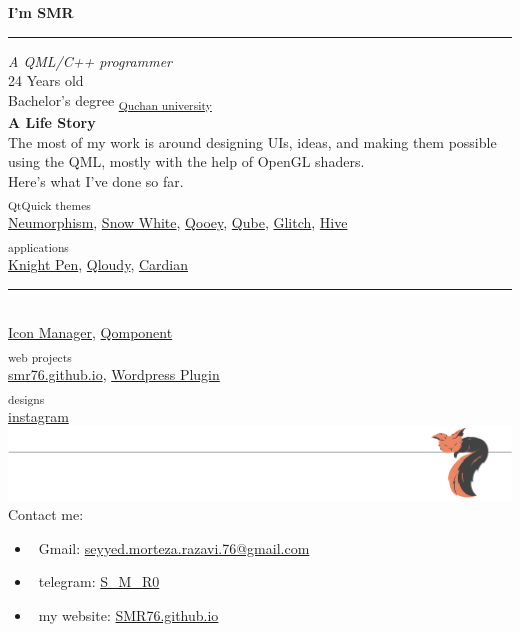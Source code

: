 	\begin{center}
	    \noindent \textbf{I'm SMR}
	    \noindent\textcolor{gray}{\rule{\linewidth}{0.5pt}}
	    \textit{A QML/C++ programmer}\\[5mm]
	    24 Years old\\
	    Bachelor's degree
	    \textsubscript{\href{https://en.wikipedia.org/wiki/Quchan\_University\_of\_Advanced\_Technologies\_Engineering}{Quchan university}}\\[5mm]
	    \textbf{\large A Life Story}\\
	    The most of my work is around designing UIs, ideas, and making them possible using the QML, mostly with the help of OpenGL shaders.\\
	    Here's what I've done so far.\\
	    \textsubscript{QtQuick themes}\\
		\href{https://github.com/SMR76/qml-neumorphism}{Neumorphism},
		\href{https://github.com/SMR76/qml-snow-white}{Snow White},
		\href{https://github.com/SMR76/qooey}{Qooey},
		\href{https://github.com/SMR76/qube}{Qube},
		\href{https://github.com/SMR76/glitch}{Glitch},
		\href{https://github.com/SMR76/hive}{Hive}
		\\[5mm]
	    \textsubscript{applications}\\
	    \href{https://github.com/SMR76/knight-pen}{Knight Pen},
	    \href{https://github.com/SMR76/cardian}{Qloudy},
	    \href{https://github.com/SMR76/cardian}{Cardian}\\[-2mm]
	    \noindent\textcolor{blueLink}{\hfil\rule{6cm}{0.5pt}\hfil}\\
	    \href{https://github.com/SMR76/icon-manager}{Icon Manager},
	    \href{https://github.com/SMR76/qomponent}{Qomponent}
		\\[5mm]
	    \textsubscript{web projects}\\
	    \href{https://smr76.github.io}{smr76.github.io},
	    \href{https://github.com/SMR76/smr-wp-plugin}{Wordpress Plugin}
		\\[5mm]
	    \textsubscript{designs}\\
	    \href{https://www.instagram.com/one.red.little.fish}{instagram}
		\includegraphics[width=\linewidth]{./sleeping-fox.pdf}\vspace*{-13mm}
	    Contact me:
	\end{center}
    \begin{itemize}[nosep]
        \item \textcolor{gmail}{\faAt}\ Gmail: \href{mailto:seyyed.morteza.razavi.76@gmail.com} {seyyed.morteza.razavi.76@gmail.com}
        \item \textcolor{telegram}{\faSendO}\ telegram: \href{tg://resolve?domain=S\_M\_R0}{\faAt S\_M\_R0}
        \item \textcolor{edge}{\faEdge}\ my website: \href{https://SMR76.github.io/#contactMe}{SMR76.github.io}
    \end{itemize}

